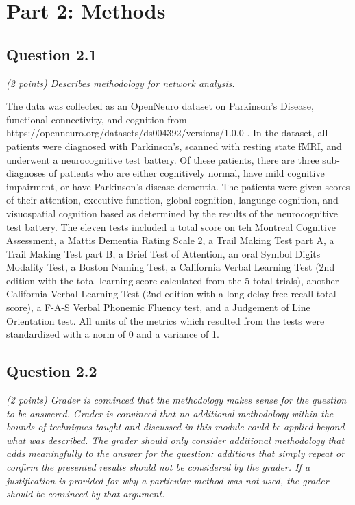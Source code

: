 \documentclass[12pt]{article}
\begin{document}
\section{Part 2: Methods}

\subsection{Question 2.1}
\textit{ (2 points) Describes methodology for network analysis.}

The data was collected as an OpenNeuro dataset on Parkinson's Disease, functional connectivity, and cognition from https://openneuro.org/datasets/ds004392/versions/1.0.0 \cite{ds004392:1.0.0}. In the dataset, all patients were diagnosed with Parkinson's, scanned with resting state fMRI, and underwent a neurocognitive test battery. Of these patients, there are three sub-diagnoses of patients who are either cognitively normal, have mild cognitive impairment, or have Parkinson's disease dementia. The patients were given scores of their attention, executive function, global cognition, language cognition, and visuospatial cognition based as determined by the results of the neurocognitive test battery. The eleven tests included a total score on teh Montreal Cognitive Assessment, a Mattis Dementia Rating Scale 2, a Trail Making Test part A, a Trail Making Test part B, a Brief Test of Attention, an oral Symbol Digits Modality Test, a Boston Naming Test, a California Verbal Learning Test (2nd edition with the total learning score calculated from the 5 total trials), another California Verbal Learning Test (2nd edition with a long delay free recall total score), a F-A-S Verbal Phonemic Fluency test, and a Judgement of Line Orientation test. All units of the metrics which resulted from the tests were standardized with a norm of 0 and a variance of 1.


\subsection{Question 2.2}
\textit{(2 points) Grader is convinced that the methodology makes sense for the question to be answered. Grader is convinced that no additional methodology within the bounds of techniques taught and discussed in this module could be applied beyond what was described. The grader should only consider additional methodology that adds meaningfully to the answer for the question: additions that simply repeat or confirm the presented results should not be considered by the grader. If a justification is provided for why a particular method was not used, the grader should be convinced by that argument. }
\end{document}

